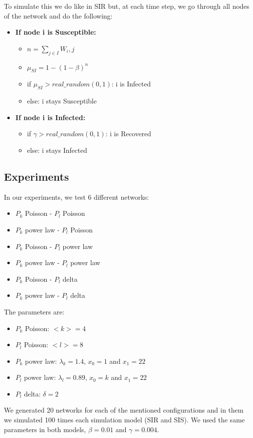To simulate this we do like in SIR but, at each time step, we go through all nodes of the network and do the following:
\begin{itemize}
    \item \textbf{If node i is Susceptible:} 
    \begin{itemize}
        \item[] $n=\sum_{j\in I}W_i,j$
        \item[] $\mu_{SI}=1-(1-\beta)^n$
        \item[] if $\mu_{SI}>real\_random(0,1)$: i is Infected
        \item[] else: i stays Susceptible  
    \end{itemize}
    \item \textbf{If node i is Infected:} 
    \begin{itemize}
        \item[] if $\gamma>real\_random(0,1)$: i is Recovered
        \item[] else: i stays Infected
    \end{itemize}
\end{itemize}
\subsection{Experiments}
\label{ssec:experiments}
In our experiments, we test 6 different networks:
\begin{itemize}
    \item $P_k$ Poisson - $P_l$ Poisson
    \item $P_k$ power law - $P_l$ Poisson
    \item $P_k$ Poisson - $P_l$ power law 
    \item $P_k$ power law - $P_l$ power law
    \item $P_k$ Poisson - $P_l$ delta
    \item $P_k$ power law - $P_l$ delta
\end{itemize}
The parameters are:
\begin{itemize}
    \item $P_k$ Poisson: $<k> = 4$
    \item $P_l$ Poisson: $<l> = 8$
    \item $P_k$ power law: $\lambda_k=1.4$, $x_0=1$ and $x_1=22$
    \item $P_l$ power law: $\lambda_l=0.89$, $x_0=k$ and $x_1=22$
    \item $P_l$ delta: $\delta = 2$
\end{itemize}
We generated 20 networks for each of the mentioned configurations and in them we simulated 100 times each simulation model (SIR and SIS). We used the same parameters in both models, $\beta = 0.01$ and $\gamma = 0.004$.